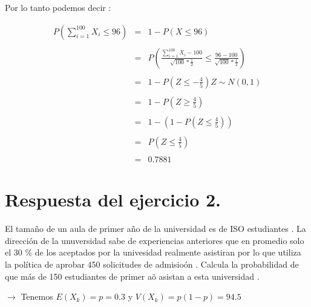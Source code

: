 \documentclass[10pt]{article}
\begin{document}
    \begin{flushleft}
   	    Por lo tanto podemos decir :
    \end{flushleft}
   	\begin{equation*}
		\begin{array}{rcl}
	   	    \displaystyle P\left(\sum_{i=1}^{100}X_{i} \leq 96\right) & = & 1 -  P\left(X \leq  96\right) 
	   	    \\
	   	    \\
	   	    & = &  \displaystyle P\left(\frac{\sum_{i=1}^{100}X_{i} - 100}{\sqrt{100}* \frac{1}{2}} \leq \frac{96 - 100}{\sqrt{100}* \frac{1}{2}}\right) 
	   	    \\
	   	    \\
	   	    & = &  \displaystyle 1 - P\left(Z \leq -\frac{4}{5}\right)Z \sim N(0,1)
	   	    \\
	   	    \\
	   	    & = &  \displaystyle 1 - P\left(Z \geq \frac{4}{5}\right)
	   	    \\
	   	    \\
	   	    & = &  \displaystyle 1 -\left( 1 - P\left(Z \leq \frac{4}{5}\right)\right)
	   	    \\
	   	    \\
	   	    & = &  \displaystyle P\left(Z \leq \frac{4}{5}\right)
	   	    \\
	   	    \\
	        & = & 0.7881
	    \end{array}
   	\end{equation*}
  	\section*{Respuesta del ejercicio 2.} 
   	\begin{flushleft}
   		El tama\~no de un aula de primer a\~no de la universidad es de ISO estudiantes . La direcci\'on de la unuversidad sabe de experiencias anteriores que en promedio solo el 30 \% de los aceptados por la univesidad realmente asistiran por lo que utiliza la pol\'itica de aprobar 450 solicitudes de admisio\'on . Calcula  la probabilidad de que m\'as de 150 estudiantes de primer a\~o asistan a esta universidad .
   	\end{flushleft}
   
   	\begin{flushleft}
   	   	$\to$ Tenemos $ E(X_k) = p = 0.3 $ y $V(X_k) = p\left(1-p\right) = 94.5$
    \end{flushleft}
    
\end{document}
